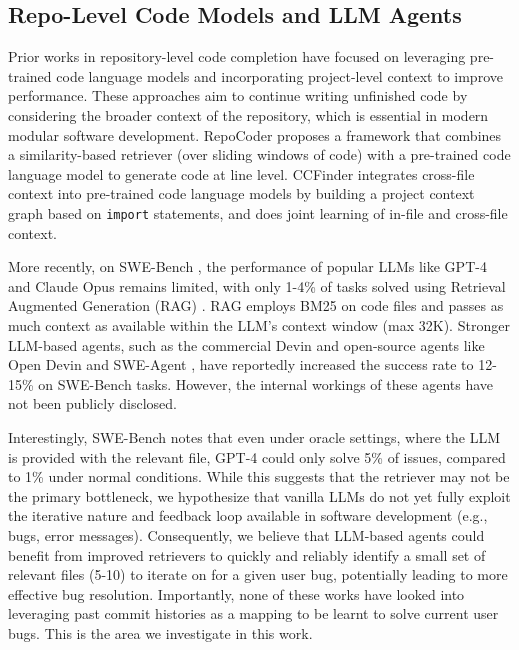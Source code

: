 \subsection{Repo-Level Code Models and LLM Agents}
Prior works in repository-level code completion have focused on leveraging pre-trained code language models and incorporating project-level context to improve performance. These approaches aim to continue writing unfinished code by considering the broader context of the repository, which is essential in modern modular software development. RepoCoder \cite{repocoder} proposes a framework that combines a similarity-based retriever (over sliding windows of code) with a pre-trained code language model to generate code at line level. CCFinder \cite{ccfinder} integrates cross-file context into pre-trained code language models by building a project context graph based on \texttt{import} statements, and does joint learning of in-file and cross-file context. 

More recently, on SWE-Bench \cite{swebench}, the performance of popular LLMs like GPT-4 and Claude Opus remains limited, with only 1-4\% of tasks solved using Retrieval Augmented Generation (RAG) \cite{rag}. RAG employs BM25 on code files and passes as much context as available within the LLM's context window (max 32K). Stronger LLM-based agents, such as the commercial Devin and open-source agents like Open Devin and SWE-Agent \cite{yang2024sweagent}, have reportedly increased the success rate to 12-15\% on SWE-Bench tasks. However, the internal workings of these agents have not been publicly disclosed.

Interestingly, SWE-Bench notes that even under oracle settings, where the LLM is provided with the relevant file, GPT-4 could only solve 5\% of issues, compared to 1\% under normal conditions. While this suggests that the retriever may not be the primary bottleneck, we hypothesize that vanilla LLMs do not yet fully exploit the iterative nature and feedback loop available in software development (e.g., bugs, error messages). Consequently, we believe that LLM-based agents could benefit from improved retrievers to quickly and reliably identify a small set of relevant files (5-10) to iterate on for a given user bug, potentially leading to more effective bug resolution. Importantly, none of these works have looked into leveraging past commit histories as a mapping to be learnt to solve current user bugs. This is the area we investigate in this work.


